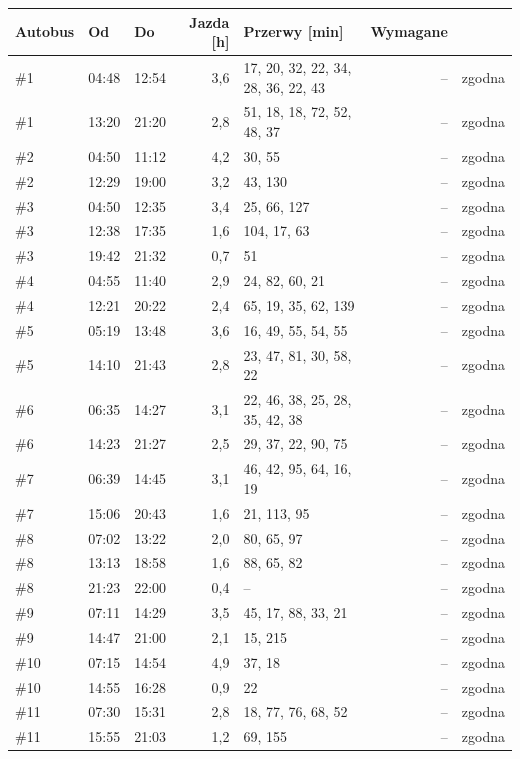 \documentclass[10pt,a4paper]{article}
\begin{document}
{\footnotesize
\begin{longtable}{@{}l l l r p{5.2cm} r l@{}}\toprule
Autobus & Od & Do & Jazda [h] & Przerwy [min] & Wymagane &  \\ \midrule\endhead
\bottomrule\endfoot
\#1 & 04:48 & 12:54 & 3,6 & 17, 20, 32, 22, 34, 28, 36, 22, 43 & -- & zgodna \\
\#1 & 13:20 & 21:20 & 2,8 & 51, 18, 18, 72, 52, 48, 37 & -- & zgodna \\
\#2 & 04:50 & 11:12 & 4,2 & 30, 55 & -- & zgodna \\
\#2 & 12:29 & 19:00 & 3,2 & 43, 130 & -- & zgodna \\
\#3 & 04:50 & 12:35 & 3,4 & 25, 66, 127 & -- & zgodna \\
\#3 & 12:38 & 17:35 & 1,6 & 104, 17, 63 & -- & zgodna \\
\#3 & 19:42 & 21:32 & 0,7 & 51 & -- & zgodna \\
\#4 & 04:55 & 11:40 & 2,9 & 24, 82, 60, 21 & -- & zgodna \\
\#4 & 12:21 & 20:22 & 2,4 & 65, 19, 35, 62, 139 & -- & zgodna \\
\#5 & 05:19 & 13:48 & 3,6 & 16, 49, 55, 54, 55 & -- & zgodna \\
\#5 & 14:10 & 21:43 & 2,8 & 23, 47, 81, 30, 58, 22 & -- & zgodna \\
\#6 & 06:35 & 14:27 & 3,1 & 22, 46, 38, 25, 28, 35, 42, 38 & -- & zgodna \\
\#6 & 14:23 & 21:27 & 2,5 & 29, 37, 22, 90, 75 & -- & zgodna \\
\#7 & 06:39 & 14:45 & 3,1 & 46, 42, 95, 64, 16, 19 & -- & zgodna \\
\#7 & 15:06 & 20:43 & 1,6 & 21, 113, 95 & -- & zgodna \\
\#8 & 07:02 & 13:22 & 2,0 & 80, 65, 97 & -- & zgodna \\
\#8 & 13:13 & 18:58 & 1,6 & 88, 65, 82 & -- & zgodna \\
\#8 & 21:23 & 22:00 & 0,4 & -- & -- & zgodna \\
\#9 & 07:11 & 14:29 & 3,5 & 45, 17, 88, 33, 21 & -- & zgodna \\
\#9 & 14:47 & 21:00 & 2,1 & 15, 215 & -- & zgodna \\
\#10 & 07:15 & 14:54 & 4,9 & 37, 18 & -- & zgodna \\
\#10 & 14:55 & 16:28 & 0,9 & 22 & -- & zgodna \\
\#11 & 07:30 & 15:31 & 2,8 & 18, 77, 76, 68, 52 & -- & zgodna \\
\#11 & 15:55 & 21:03 & 1,2 & 69, 155 & -- & zgodna \\

\end{longtable}}
\end{document}
